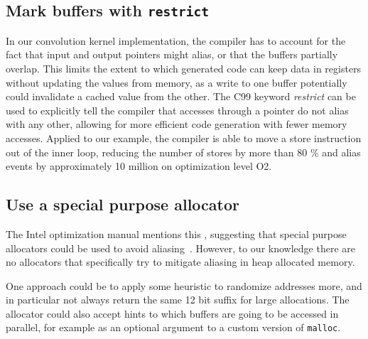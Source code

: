 \documentclass[10pt, conference, compsocconf]{IEEEtran}
\begin{document}
\subsection{Mark buffers with \texttt{restrict}}
In our convolution kernel implementation, the compiler has to account for the fact that input and output pointers might alias, or that the buffers partially overlap.
This limits the extent to which generated code can keep data in registers without updating the values from memory, as a write to one buffer potentially could invalidate a cached value from the other.
The C99 keyword \emph{restrict} can be used to explicitly tell the compiler that accesses through a pointer do not alias with any other, allowing for more efficient code generation with fewer memory accesses.
Applied to our example, the compiler is able to move a store instruction out of the inner loop, reducing the number of stores by more than 80 \% and alias events by approximately 10 million on optimization level O2.

\subsection{Use a special purpose allocator}
The Intel optimization manual mentions this%
, suggesting that special purpose allocators could be used to avoid aliasing~\cite{OptimizationManual}.
However, to our knowledge there are no allocators that specifically try to mitigate aliasing in heap allocated memory.

One approach could be to apply some heuristic to randomize addresses more, and in particular not always return the same 12 bit suffix for large allocations.
The allocator could also accept hints to which buffers are going to be accessed in parallel, for example as an optional argument to a custom version of \texttt{malloc}.
\end{document}
